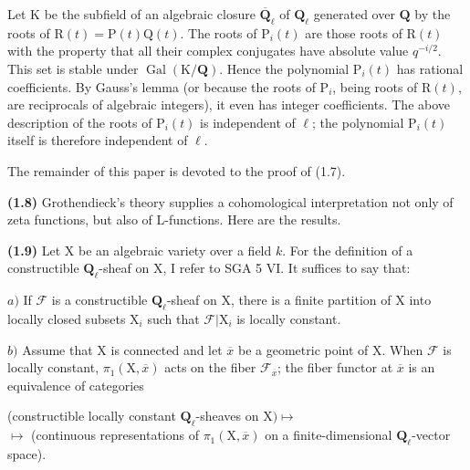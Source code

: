 \documentclass[10pt,leqno]{article}
\begin{document}
\noindent Let \(\mathrm{K}\) be the subfield of an algebraic closure \(\overline{\mathbf{Q}}_{\ell }\) of \(\mathbf{Q}_{\ell }\) generated over \(\mathbf{Q}\) by the roots of \(\mathrm{R}(t)=\mathrm{P}(t)\mathrm{Q}(t)\). The roots of \(\mathrm{P}_{i}(t)\) are those roots of \(\mathrm{R}(t)\) with the property that all their complex conjugates have absolute value \(q^{- i/2}\). This set is stable under \(\operatorname{Gal}(\mathrm{K}/\mathbf{Q})\). Hence the polynomial \(\mathrm{P}_{i}(t)\) has rational coefficients. By Gauss’s lemma (or because the roots of \(\mathrm{P}_{i}\), being roots of \(\mathrm{R}(t)\), are reciprocals of algebraic integers), it even has integer coefficients. The above description of the roots of \(\mathrm{P}_{i}(t)\) is independent of \(\ell \); the polynomial \(\mathrm{P}_{i}(t)\) itself is therefore independent of \(\ell \).\par

\noindent The remainder of this paper is devoted to the proof of (1.7).\par

\noindent \textbf{(1.8)} Grothendieck’s theory supplies a cohomological interpretation not only of zeta functions, but also of \(\mathrm{L}\)-functions. Here are the results.\par

\noindent \textbf{(1.9)} Let \(\mathrm{X}\) be an algebraic variety over a field \(k\). For the definition of a constructible \(\mathbf{Q}_{\ell }\)-sheaf on \(\mathrm{X}\), I refer to SGA 5 VI. It suffices to say that:\par

\noindent \(a)\) If \(\mathcal{F} \) is a constructible \(\mathbf{Q}_{\ell }\)-sheaf on \(\mathrm{X}\), there is a finite partition of \(\mathrm{X}\) into locally closed subsets \(\mathrm{X}_{i}\) such that \(\mathcal{F} |\mathrm{X}_{i}\) is locally constant.\par

\noindent \(b)\) Assume that \(\mathrm{X}\) is connected and let \(\overline{x}\) be a geometric point of \(\mathrm{X}\). When \(\mathcal{F} \) is locally constant, \(\pi _{1}(\mathrm{X},\overline{x})\) acts on the fiber \(\mathcal{F} _{\overline{x}}\); the fiber functor at \(\overline{x}\) is an equivalence of categories\par

\begin{center}(constructible locally constant \(\mathbf{Q}_{\ell }\)-sheaves on \(\mathrm{X}) \longmapsto \)\\ \(\longmapsto \) (continuous representations of \(\pi _{1}(\mathrm{X},\overline{x})\) on a finite-dimensional \(\mathbf{Q}_{\ell }\)-vector space).\end{center}
\end{document}
